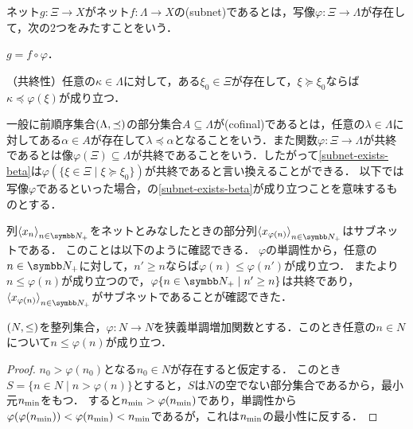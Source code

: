 \documentclass{ltjsbook}
\begin{document}
\begin{thmbox}
\begin{definition}[（サブネット）] ネット\(g \colon \Xi \to X\)がネット\(f \colon \Lambda \to X\)の(subnet)であるとは，写像\(\varphi \colon \Xi \to \Lambda\)が存在して，次の2つをみたすことをいう．
    \begin{conditions}
        \item\label{subnet-comp} \(g = f \circ \varphi\)．
        \item\label{subnet-exists-beta} （共終性）任意の\(\kappa \in \Lambda\)に対して，ある\(\xi_0 \in \Xi\)が存在して，\(\xi \succeq \xi_0\)ならば\(\kappa \preceq \varphi(\xi)\)が成り立つ．
    \end{conditions}
\end{definition}
\end{thmbox}

一般に前順序集合\((\Lambda, \mathord{\preceq})\)の部分集合\(A \subseteq \Lambda\)が(cofinal)であるとは，任意の\(\lambda \in \Lambda\)に対してある\(\alpha \in A\)が存在して\(\lambda \preceq \alpha\)となることをいう．また関数\(\varphi \colon \Xi \to \Lambda\)が共終であるとは像\(\varphi(\Xi) \subseteq \Lambda\)が共終であることをいう．したがって\ref{subnet-exists-beta}は\(\varphi(\{ \xi \in \Xi \mid \xi \succeq \xi_0\})\)が共終であると言い換えることができる．
以下では写像\(\varphi\)であるといった場合，の\ref{subnet-exists-beta}が成り立つことを意味するものとする．

列\(\Sequencen{x}\)をネットとみなしたときの部分列\(\Subsequence{x}\)はサブネットである．
このことは以下のように確認できる．
\(\varphi\)の単調性から，任意の\(n \in \PositiveInteger\)に対して，\(n' \geq n\)ならば\(\varphi(n) \leq \varphi(n')\)が成り立つ．
またより\(n \leq \varphi(n)\)が成り立つので，\(\varphi \{ n \in \PositiveInteger \mid n' \geq n\}\)は共終であり，\(\Subsequence{x}\)がサブネットであることが確認できた．

\begin{thmbox}
\begin{proposition} \((N, \mathord{\leq})\)を整列集合，\(\varphi\colon N \to N\)を狭義単調増加関数とする．このとき任意の\(n \in N\)について\(n \leq \varphi(n)\)が成り立つ．
\end{proposition}
\end{thmbox}

\begin{proof} \(n_0 \gt \varphi(n_0)\)となる\(n_0 \in N\)が存在すると仮定する．
このとき\(S = \{ n \in N \mid n > \varphi(n)\}\)とすると，\(S\)は\(N\)の空でない部分集合であるから，最小元\(n_{\text{min}}\)をもつ．
すると\(n_{\text{min}} > \varphi(n_{\text{min}})\)であり，単調性から\(\varphi(\varphi(n_{\text{min}})) < \varphi(n_{\text{min}}) < n_{\text{min}}\)であるが，これは\(n_{\text{min}}\)の最小性に反する．
\end{proof}
\end{document}

